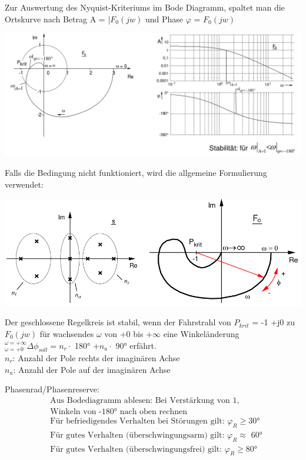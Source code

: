 \documentclass[10pt,a4paper]{article}
\begin{document}
Zur Auswertung des Nyquist-Kriteriums im Bode Diagramm, spaltet man die Ortskurve nach Betrag
A = |$F_0 (jw)$ und Phase $\varphi$ = $F_0(jw)$

\includegraphics[width=0.94\columnwidth]{Figures/Nyquist_Bode.png}

Falls die Bedingung nicht funktioniert, wird die allgemeine Formulierung verwendet:

\includegraphics[width=0.94\columnwidth]{Figures/Allgemein_Nyquist.png}

\begin{mdframed}[style=exercise]
	Der geschlossene Regelkreis ist stabil, wenn der Fahrstrahl von $P_{krit}$ = -1 +j0
	zu $F_0 (jw)$ für wachsendes $\omega$ von +0 bis +$\infty$ eine Winkeländerung
	$^{\omega=+\infty}_{\omega=+0} \Delta \phi _{soll} = n_r \cdot$ 180° $+n_a \cdot$ 90°
	erfährt.\\
	$n_r$: Anzahl der Pole rechts der imaginären Achse\\
	$n_a$: Anzahl der Pole auf der imaginären Achse
\end{mdframed}

Phasenrad/Phasenreserve:
\begin{align*}
	 & \text{Aus Bodediagramm ablesen: Bei Verstärkung von 1,}                              \\
	 & \text{Winkeln von -180° nach oben rechnen}                                           \\
	 & \text{Für befriedigendes Verhalten bei Störungen gilt: }\varphi _R \geq \text{30°}   \\
	 & \text{Für gutes Verhalten (überschwingungsarm) gilt: }\varphi _R \approx \text{ 60°} \\
	 & \text{Für gutes Verhalten (überschwingungsfrei) gilt: }\varphi _R \geq \text{80°}    \\
\end{align*}
\end{document}
